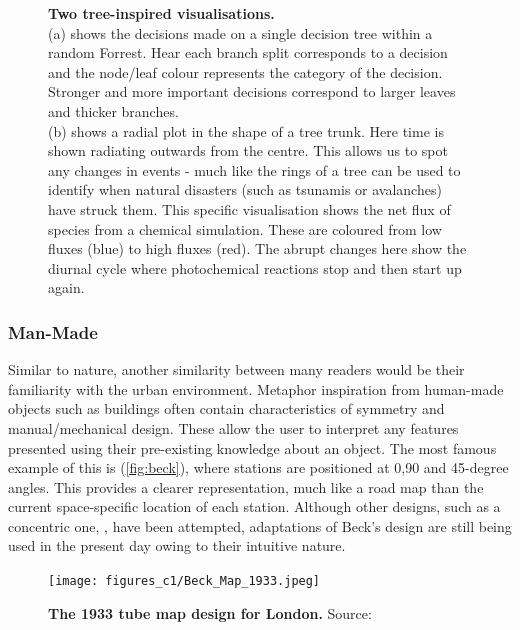 \begin{figure}[H]
        \caption{\textbf{Two tree-inspired visualisations. }\\
         (a) shows the decisions made on a single decision tree within a random Forrest. Hear each branch split corresponds to a decision and the node/leaf colour represents the category of the decision. Stronger and more important decisions correspond to larger leaves and thicker branches. \\
          (b) shows a radial plot in the shape of a tree trunk. Here time is shown radiating outwards from the centre. This allows us to spot any changes in events - much like the rings of a tree can be used to identify when natural disasters (such as tsunamis or avalanches) have struck them. This specific visualisation shows the net flux of species from a chemical simulation.
These are coloured from low fluxes (blue) to high fluxes (red). The abrupt changes here show the diurnal cycle where photochemical reactions stop and then start up again. }
        \label{fig:trees}
\end{figure}


\subsubsection{Man-Made}\label{sec:metman}
Similar to nature, another similarity between many readers would be their familiarity with the urban environment. Metaphor inspiration from human-made objects such as buildings often contain characteristics of symmetry and manual/mechanical design. These allow the user to interpret any features presented using their pre-existing knowledge about an object. The most famous example of this is (\autoref{fig:beck}), where stations are positioned at 0,90 and 45-degree angles. This provides a clearer representation, much like a road map than the current space-specific location of each station. Although other designs, such as a concentric one, \citep{circ}, have been attempted, adaptations of Beck's design are still being used in the present day owing to their intuitive nature.


\begin{figure}[H]
     \centering
         \texttt{[image: figures\_c1/Beck\_Map\_1933.jpeg]}
         \vspace{5mm}

         \caption{\textbf{The 1933 tube map design for London.} Source: \citep{beck}}

         \label{fig:beck}

\end{figure}

